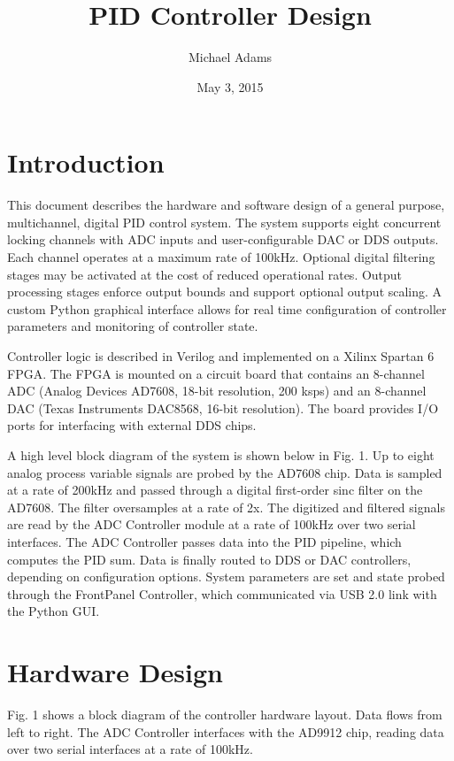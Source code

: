 \documentclass[11pt]{article}
\title{PID Controller Design}
\author{Michael Adams}
\date{May 3, 2015}
\begin{document}
\maketitle

\section{Introduction}

This document describes the hardware and software design of a general
purpose, multichannel, digital PID control system. The system supports
eight concurrent locking channels with ADC inputs and user-configurable
DAC or DDS outputs. Each channel operates at a maximum rate of 100kHz.
Optional digital filtering stages may be activated at the cost of
reduced operational rates. Output processing stages enforce output
bounds and support optional output scaling. A custom Python graphical
interface allows for real time configuration of controller parameters
and monitoring of controller state.

Controller logic is described in Verilog and implemented on a Xilinx
Spartan 6 FPGA\@. The FPGA is mounted on a circuit board that contains
an 8-channel ADC (Analog Devices AD7608, 18-bit resolution, 200 ksps)
and an 8-channel DAC (Texas Instruments DAC8568, 16-bit resolution). The
board provides I/O ports for interfacing with external DDS chips.

A high level block diagram of the system is shown below in Fig. 1.
Up to eight analog process variable signals are probed by the AD7608
chip. Data is sampled at a rate of 200kHz and passed through a digital
first-order sinc filter on the AD7608. The filter oversamples at a rate of
2x. The digitized and filtered signals are read by the ADC Controller
module at a rate of 100kHz over two serial interfaces. The ADC
Controller passes data into the PID pipeline, which computes the PID
sum. Data is finally routed to DDS or DAC controllers, depending on
configuration options. System parameters are set and state probed
through the FrontPanel Controller, which communicated via USB 2.0 link
with the Python GUI\@.

\section{Hardware Design}

Fig. 1 shows a block diagram of the controller hardware layout. Data
flows from left to right. The ADC Controller interfaces with the AD9912
chip, reading data over two serial interfaces at a rate of 100kHz. 
\end{document}

